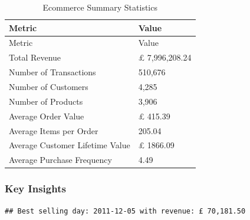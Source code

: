 \documentclass[
]{article}
\newenvironment{Shaded}{\begin{snugshade}}{\end{snugshade}}
\newcommand{\AttributeTok}[1]{\textcolor[rgb]{0.13,0.29,0.53}{#1}}
\newcommand{\CommentTok}[1]{\textcolor[rgb]{0.56,0.35,0.01}{\textit{#1}}}
\newcommand{\DecValTok}[1]{\textcolor[rgb]{0.00,0.00,0.81}{#1}}
\newcommand{\FunctionTok}[1]{\textcolor[rgb]{0.13,0.29,0.53}{\textbf{#1}}}
\newcommand{\NormalTok}[1]{#1}
\newcommand{\OtherTok}[1]{\textcolor[rgb]{0.56,0.35,0.01}{#1}}
\newcommand{\SpecialCharTok}[1]{\textcolor[rgb]{0.81,0.36,0.00}{\textbf{#1}}}
\newcommand{\StringTok}[1]{\textcolor[rgb]{0.31,0.60,0.02}{#1}}
\begin{document}
\begin{longtable}[]{@{}ll@{}}
\caption{Ecommerce Summary Statistics}\tabularnewline
\toprule\noalign{}
Metric & Value \\
\midrule\noalign{}
\endfirsthead
\toprule\noalign{}
Metric & Value \\
\midrule\noalign{}
\endhead
\bottomrule\noalign{}
\endlastfoot
Total Revenue & £ 7,996,208.24 \\
Number of Transactions & 510,676 \\
Number of Customers & 4,285 \\
Number of Products & 3,906 \\
Average Order Value & £ 415.39 \\
Average Items per Order & 205.04 \\
Average Customer Lifetime Value & £ 1866.09 \\
Average Purchase Frequency & 4.49 \\
\end{longtable}

\subsubsection{Key Insights}\label{key-insights}

\begin{Shaded}
\end{Shaded}

\begin{verbatim}
## Best selling day: 2011-12-05 with revenue: £ 70,181.50
\end{verbatim}

\begin{Shaded}
\end{Shaded}
\end{document}
